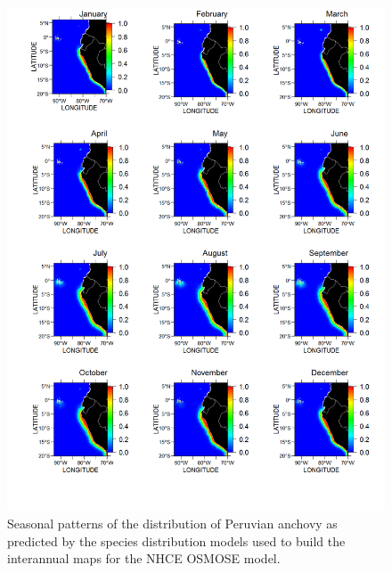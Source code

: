 \begin{figure}
\centering
\includegraphics[height=0.8\textheight]{figures/anchovy-climatology}
\caption[Seasonal patterns of the distribution of Peruvian anchovy]{Seasonal patterns of the distribution of Peruvian anchovy as predicted by the species distribution models used to build the interannual maps for the NHCE OSMOSE model.}
\label{fig:anchovy-climatology}
\end{figure}


